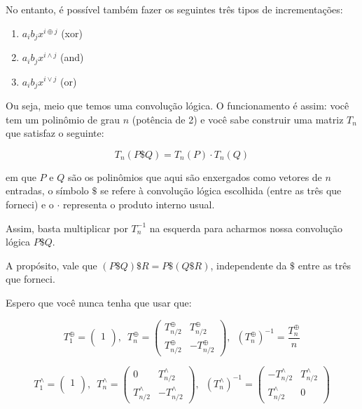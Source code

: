 No entanto, é possível também fazer os seguintes três tipos de incrementações:

\begin{enumerate}
    \item $a_i b_j x^{i \oplus j}$ (xor)
    \item $a_i b_j x^{i \land j}$ (and)
    \item $a_i b_j x^{i \lor j}$ (or)
\end{enumerate}

Ou seja, meio que temos uma convolução lógica. O funcionamento é assim:
você tem um polinômio de grau $n$ (potência de 2) e você sabe construir uma
matriz $T_n$ que satisfaz o seguinte:

$$T_n(P \$ Q) = T_n(P) \cdot T_n(Q)$$

em que $P$ e $Q$ são os polinômios que aqui são enxergados como vetores de $n$ entradas,
o símbolo $\$$ se refere à convolução lógica escolhida (entre as três que forneci) e o $\cdot$
representa o produto interno usual.

Assim, basta multiplicar por $T_n^{-1}$ na esquerda para acharmos nossa convolução lógica $P \$ Q$.

A propósito, vale que $(P \$ Q) \$ R = P \$ (Q \$ R)$, independente da $\$$ entre as três que forneci.

Espero que você nunca tenha que usar que:

$$ T_1^{\oplus} = \begin{pmatrix}
1 \\
\end{pmatrix}, \, \, \, T_n^{\oplus} = \begin{pmatrix}
T_{n/2}^{\oplus} & T_{n/2}^{\oplus} \\
T_{n/2}^{\oplus} & -T_{n/2}^{\oplus}
\end{pmatrix}, \, \, \, \left(T_n^{\oplus}\right)^{-1} = \dfrac{T_n^{\oplus}}{n}
$$

$$ T_1^{\land} = \begin{pmatrix}
1 \\
\end{pmatrix}, \, \, \, T_n^{\land} = \begin{pmatrix}
0 & T_{n/2}^{\land} \\
T_{n/2}^{\land} & -T_{n/2}^{\land}
\end{pmatrix}, \, \, \, \left(T_n^{\land}\right)^{-1} = \begin{pmatrix}
- T_{n/2}^{\land} & T_{n/2}^{\land} \\
T_{n/2}^{\land} & 0
\end{pmatrix}
$$

